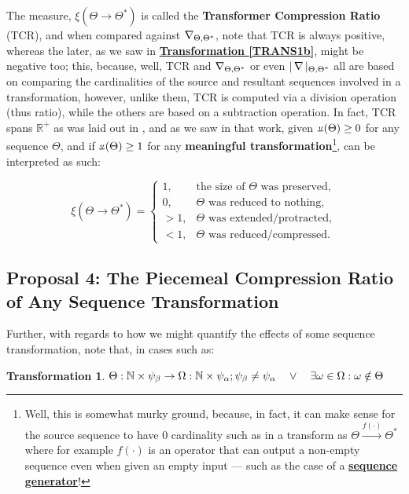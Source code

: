 \documentclass[a4paper, 18pt]{book} %
\newcommand{\invdel}[1]{\mathop{\rotatebox[origin=c]{180}{$\Delta$}}#1}
\newtheorem{trans}{Transformation}
\newcommand{\invpi}{\rotatebox[origin=c]{180}{$\pi$}}
\begin{document}
 The measure, $\xi(\Theta \rightarrow \Theta^*)$ is called the \textbf{Transformer Compression Ratio} (TCR), and when compared against $\invdel_{\Theta,\Theta^*}$, note that TCR is always positive, whereas the later, as we saw in  \textbf{\hyperref[TRANS1b]{Transformation \ref{TRANS1b}}}, might be negative too; this, because, well, TCR and $\invdel_{\Theta,\Theta^*}$ or even $|\invdel|_{\Theta,\Theta^*}$ all are based on comparing the cardinalities of the source and resultant sequences involved in a transformation, however, unlike them, TCR is computed via a division operation (thus ratio), while the others are based on a subtraction operation. In fact, TCR spans $\mathbb{R^+}$ as was laid out in \cite{transformatics}, and as we saw in that work, given $\invpi(\Theta) \geq 0$ for any sequence $\Theta$, and if $\invpi(\Theta) \geq 1$ for any \textbf{meaningful transformation}\footnote{Well, this is somewhat murky ground, because, in fact, it can make sense for the source sequence to have 0 cardinality such as in a transform as $\Theta \xrightarrow{f(\cdot)} \Theta^*$ where for example $f(\cdot)$ is an operator that can output a non-empty sequence even when given an empty input --- such as the case of a \textbf{\hyperref[RES9]{sequence generator}}!}, can be interpreted as such:
 
 \vspace{1em}
 \begin{equation}
\label{EQTCRCASESb}
\xi(\Theta \rightarrow \Theta^*) = \begin{cases}
1, & \text{the size of }\Theta \text{ was preserved},\\
0, & \Theta \text{ was reduced to nothing},\\
> 1, & \Theta \text{ was extended/protracted},\\
< 1, & \Theta \text{ was reduced/compressed}.
\end{cases}
\end{equation}
\vspace{1em}


\subsection{Proposal 4: The Piecemeal Compression Ratio of Any Sequence Transformation\cite{transformatics}}

Further, with regards to how we might quantify the effects of some sequence transformation, note that, in cases such as:

\vspace{1em}
\begin{trans}
\label{TRANSPCRb}
$\Theta: \mathbb{N} \times \psi_\beta \rightarrow \Omega: \mathbb{N} \times \psi_\alpha;\\
\psi_\beta \neq \psi_\alpha \quad \lor \quad \exists \omega \in \Omega: \omega \notin \Theta$
\end{trans}
\vspace{1em}
\end{document}
